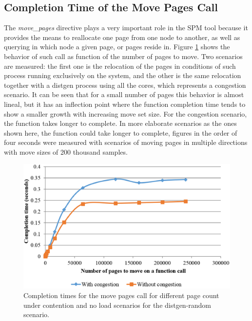 \subsection{Completion Time of the Move Pages Call}\label{subsection:pmu-movpatime}


The \textit{move\_pages} directive plays a very important role in the SPM tool because it provides the means to reallocate one page from one node to another, as well as querying in which node a given page, or pages reside in. Figure \ref{fig:mov-pages-time.eps} shows the behavior of such call as function of the number of pages to move. Two scenarios are measured: the first one is the relocation of the pages in conditions of such process running exclusively on the system, and the other is the same relocation together with a distgen process using all the cores, which represents a congestion scenario. It can be seen that for a small number of pages this behavior is almost lineal, but it has an inflection point where the function completion time tends to show a smaller growth with increasing move set size. For the congestion scenario, the function takes longer to complete. In more elaborate scenarios as the ones shown here, the function could take longer to complete, figures in the order of four seconds were measured with scenarios of moving pages in multiple directions with move sizes of 200 thousand samples.

\begin{figure}  
	\centering
		\includegraphics[width=.8\textwidth]{figures/mov-pages-time.eps}
		\caption{Completion times for the move pages call for different page count under contention and no load scenarios for the distgen-random scenario.}
		\label{fig:mov-pages-time.eps}
\end{figure}
